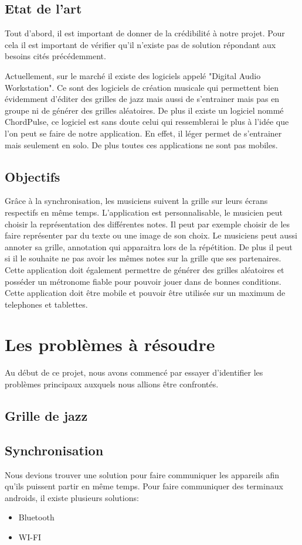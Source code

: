 \documentclass[a4paper,11pt]{article}
\begin{document}
\subsection{Etat de l'art}
Tout d'abord, il est important de donner de la crédibilité à notre projet. Pour cela il est important de vérifier qu'il n'existe pas de solution répondant aux besoins cités précédemment.

Actuellement, sur le marché il existe des logiciels appelé "Digital Audio Workstation". Ce sont des logiciels de création musicale qui permettent bien évidemment d'éditer des grilles de jazz mais aussi de s'entrainer mais pas en groupe ni de générer des grilles aléatoires. De plus il existe un logiciel nommé ChordPulse, ce logiciel est sans doute celui qui ressemblerai le plus à l'idée que l'on peut se faire de notre application. En effet, il léger permet de s'entrainer mais seulement en solo. De plus toutes ces applications ne sont pas mobiles.

\subsection{Objectifs}

Grâce à la synchronisation, les musiciens suivent la grille sur leurs écrans respectifs en même temps. L'application est personnalisable, le musicien peut choisir la représentation des différentes notes. Il peut par exemple choisir de les faire représenter par du texte ou une image de son choix. Le musiciens peut aussi annoter sa grille, annotation qui apparaitra lors de la répétition. De plus il peut si il le souhaite ne pas avoir les mêmes notes sur la grille que ses partenaires. Cette application doit également permettre de générer des grilles aléatoires et posséder un métronome fiable pour pouvoir jouer dans de bonnes conditions. Cette application doit être mobile et pouvoir être utilisée sur un maximum de telephones et tablettes. 

\section{Les problèmes à résoudre}
Au début de ce projet, nous avons commencé par essayer d'identifier les problèmes principaux auxquels nous allions être confrontés. 
\subsection{Grille de jazz}

\subsection{Synchronisation}
Nous devions trouver une solution pour faire communiquer les appareils afin qu'ils puissent partir en même temps. 
Pour faire communiquer des terminaux androids, il existe plusieurs solutions:
\begin{itemize}
        \item Bluetooth

        \item WI-FI
\end{itemize}
\end{document}
